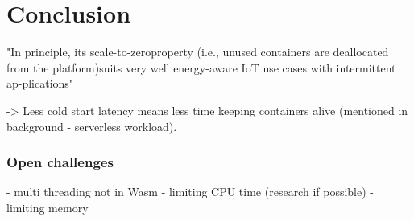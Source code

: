\chapter{Conclusion}
\label{chapter:conclusion}

"In principle, its scale-to-zeroproperty (i.e., unused containers are deallocated from the platform)suits very well energy-aware IoT use cases with intermittent ap-plications" \cite{Aslanpour2021}

-> Less cold start latency means less time keeping containers alive (mentioned in background - serverless workload).

\subsection{Open challenges}

- multi threading not in Wasm
- limiting CPU time (research if possible)
- limiting memory

